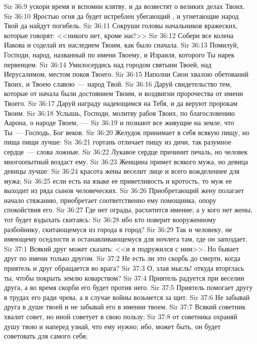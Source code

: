 \vs Sir 36:9 ускори время и вспомни клятву, и да возвестят о великих делах Твоих.
\vs Sir 36:10 Яростью огня да будет истреблен убегающий , и угнетающие народ Твой да найдут погибель.
\vs Sir 36:11 Сокруши головы начальников вражеских, которые говорят: <<никого нет, кроме нас!>>
\vs Sir 36:12 Собери все колена Иакова и соделай их наследием Твоим, как было сначала.
\vs Sir 36:13 Помилуй, Господи, народ, названный по имени Твоему, и Израиля, которого Ты нарек первенцем.
\vs Sir 36:14 Умилосердись над городом святыни Твоей, над Иерусалимом, местом покоя Твоего.
\vs Sir 36:15 Наполни Сион хвалою обетований Твоих, и Твоею славою~--- народ Твой.
\vs Sir 36:16 Даруй свидетельство тем, которые от начала были достоянием Твоим, и воздвигни пророчества от имени Твоего.
\vs Sir 36:17 Даруй награду надеющимся на Тебя, и да веруют пророкам Твоим.
\vs Sir 36:18 Услышь, Господи, молитву рабов Твоих, по благословению Аарона, о народе Твоем,~---
\vs Sir 36:19 и познают все живущие на земле, что Ты~--- Господь, Бог веков.
\rsbpar\vs Sir 36:20 Желудок принимает в себя всякую пищу, но пища пищи лучше:
\vs Sir 36:21 гортань отличает пищу из дичи, так разумное сердце~--- слова ложные.
\vs Sir 36:22 Лукавое сердце причинит печаль, но человек многоопытный воздаст ему.
\vs Sir 36:23 Женщина примет всякого мужа, но девица девицы лучше:
\vs Sir 36:24 красота жены веселит лице и всего вожделеннее для мужа;
\vs Sir 36:25 если есть на языке ее приветливость и кротость, то муж ее выходит из ряда сынов человеческих.
\vs Sir 36:26 Приобретающий жену полагает начало стяжанию, приобретает соответственно ему помощника, опору спокойствия его.
\vs Sir 36:27 Где нет ограды,  расхитится имение; а у кого нет жены, тот будет вздыхать скитаясь:
\vs Sir 36:28 ибо кто поверит вооруженному разбойнику, скитающемуся из города в город?
\vs Sir 36:29 Так и человеку, не имеющему оседлости и останавливающемуся для ночлега там, где он запоздает.
\vs Sir 37:1 Всякий друг может сказать: <<и я подружился с ним>>. Но бывает друг по имени только другом.
\vs Sir 37:2 Не есть ли это скорбь до смерти, когда приятель и друг обращается во врага?
\vs Sir 37:3 О, злая мысль! откуда вторглась ты, чтобы покрыть землю коварством?
\vs Sir 37:4 Приятель радуется при веселии друга, а во время скорби его будет против него.
\vs Sir 37:5 Приятель помогает другу в трудах его ради чрева, а в случае войны возьмется за щит.
\vs Sir 37:6 Не забывай друга в душе твоей и не забывай его в имении твоем.
\vs Sir 37:7 Всякий советник хвалит  совет, но иной советует в свою пользу;
\vs Sir 37:8 от советника охраняй душу твою и наперед узнай, что ему нужно; ибо, может быть, он будет советовать для самого себя;
